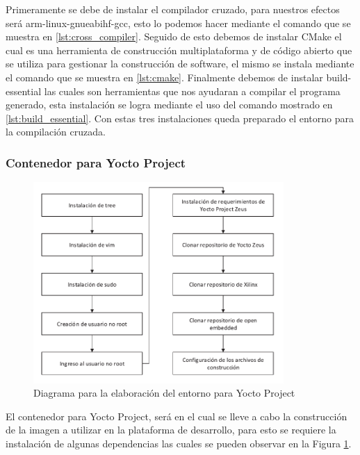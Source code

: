 Primeramente se debe de instalar el compilador cruzado, para nuestros efectos será arm-linux-gnueabihf-gcc, esto lo podemos hacer mediante el comando que se muestra en \ref{lst:cross_compiler}. Seguido de esto debemos de instalar CMake el cual es una herramienta de construcción multiplataforma y de código abierto que se utiliza para gestionar la construcción de software, el mismo se instala mediante el comando que se muestra en \ref{lst:cmake}. Finalmente debemos  de instalar build-essential las cuales son herramientas que nos ayudaran a compilar el programa generado, esta instalación se logra mediante el uso del comando mostrado en \ref{lst:build_essential}. Con estas tres instalaciones queda preparado el entorno para la compilación cruzada. 


\subsubsection{Contenedor para Yocto Project}\label{subsec:generacion_entorno_yocto}

\begin{figure}[h!] 
    \centering
    \includegraphics[width=0.85\textwidth]{fig/especifico_2/diagrama_de_entorno_yocto_project.pdf}
    \caption{Diagrama para la elaboración del entorno para Yocto Project}
    \label{fig:yocto_enviroment_diagram_figure}
\end{figure}

El contenedor para Yocto Project, será en el cual se lleve a cabo la construcción de la imagen a utilizar en la plataforma de desarrollo, para esto se requiere la instalación de algunas dependencias las cuales se pueden observar en la Figura \ref{fig:yocto_enviroment_diagram_figure}.



